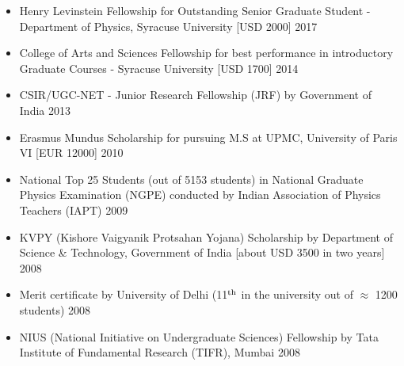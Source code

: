 
 \begin{itemize}
 \vspace{1mm} 
 \item Henry Levinstein Fellowship for Outstanding Senior Graduate Student - Department of Physics, Syracuse University [USD 2000] \hfill 2017  \vspace{1mm} 
\item  College of Arts and Sciences Fellowship for best performance in introductory Graduate Courses - Syracuse University [USD 1700] \hfill 2014  \vspace{1mm} 
 \item CSIR/UGC-NET - Junior Research Fellowship (JRF) by Government of India \hfill 2013 \vspace{1mm} 
 \item Erasmus Mundus Scholarship for pursuing M.S at UPMC, University of Paris VI  [EUR 12000] \hfill \textsc{2010} \vspace{1mm} 
 \item National Top 25 Students (out of 5153 students) in National Graduate Physics Examination (NGPE) conducted by Indian Association of Physics Teachers (IAPT) \hfill \textsc{2009} \vspace{1mm} 
  \item KVPY (Kishore Vaigyanik Protsahan Yojana) Scholarship by Department of Science \& Technology, Government of India [about USD 3500 in two years] \hfill 2008 
 \item Merit certificate by University of Delhi (11$^{\rm{th}}$ in the university out of $\approx$ 1200 students) \hfill 2008 \vspace{1mm} 
 \item NIUS (National Initiative on Undergraduate Sciences) Fellowship by Tata Institute of Fundamental Research (TIFR), Mumbai  \hfill 2008 \vspace{1mm} 
 \end{itemize} 

